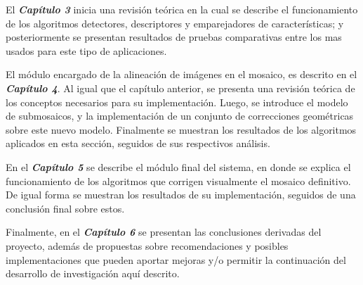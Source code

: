 El \textit{\textbf{Capítulo 3}} inicia una revisión teórica en la cual se describe el funcionamiento de los algoritmos detectores, descriptores y emparejadores de características; y posteriormente se presentan resultados de pruebas comparativas entre los mas usados para este tipo de aplicaciones. 

El módulo encargado de la alineación de imágenes en el mosaico, es descrito en el \textit{\textbf{Capítulo 4}}. Al igual que el capítulo anterior, se presenta una revisión teórica de los conceptos necesarios para su implementación. Luego, se introduce el modelo de submosaicos, y la implementación de un conjunto de correcciones geométricas sobre este nuevo modelo. Finalmente se muestran los resultados de los algoritmos aplicados en esta sección, seguidos de sus respectivos análisis.

En el \textit{\textbf{Capítulo 5}} se describe el módulo final del sistema, en donde se explica el funcionamiento de los algoritmos que corrigen visualmente el mosaico definitivo. De igual forma se muestran los resultados de su implementación, seguidos de una conclusión final sobre estos.

Finalmente, en el \textit{\textbf{Capítulo 6}} se presentan las conclusiones derivadas del proyecto, además de propuestas sobre recomendaciones y posibles implementaciones que pueden aportar mejoras y/o permitir la continuación del desarrollo de investigación aquí descrito.
